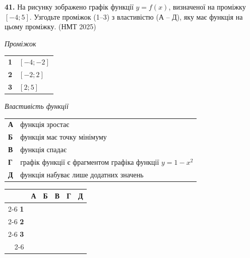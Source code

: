 \documentclass[14pt]{extarticle}
\newcommand{\nmtyear}[1]{\hfill{\small\color{yearcolor}(НМТ #1)}}
\begin{document}
\noindent\textbf{41.} На рисунку зображено графік функції $y=f(x)$, визначеної на проміжку $[-4; 5]$. Узгодьте проміжок (1–3) з властивістю (А – Д), яку має функція на цьому проміжку. \nmtyear{2025}

\vspace{0.2cm}

\noindent
\begin{minipage}[t]{0.55\textwidth}
    \vspace{0pt}
    \textit{Проміжок} \par \vspace{0.2cm}
    \begin{tabular}{@{}p{0.5cm} p{3cm}@{}}
    \textbf{1} & $[-4; -2]$ \\[0.3cm]
    \textbf{2} & $[-2; 2]$ \\[0.3cm]
    \textbf{3} & $[2; 5]$ \\
    \end{tabular}
    
    \vspace{0.3cm}
    \textit{Властивість функції} \par \vspace{0.2cm}
    \begin{tabular}{@{}p{0.5cm} p{7cm}@{}}
    \textbf{А} & функція зростає \\[0.2cm]
    \textbf{Б} & функція має точку мінімуму \\[0.2cm]
    \textbf{В} & функція спадає \\[0.2cm]
    \textbf{Г} & графік функції є фрагментом графіка функції $y=1-x^2$ \\[0.2cm]
    \textbf{Д} & функція набуває лише додатних значень \\
    \end{tabular}
    
    \vspace{0.3cm}
    
    \begingroup
    \setlength{\tabcolsep}{4pt}
    \renewcommand{\arraystretch}{1.2}
    \small
    \begin{tabular}{r|c|c|c|c|c|}
         \multicolumn{1}{c}{} & \multicolumn{1}{c}{\textbf{А}} & \multicolumn{1}{c}{\textbf{Б}} & \multicolumn{1}{c}{\textbf{В}} & \multicolumn{1}{c}{\textbf{Г}} & \multicolumn{1}{c}{\textbf{Д}} \\ \cline{2-6}
         \textbf{1} & & & & & \\ \cline{2-6}
         \textbf{2} & & & & & \\ \cline{2-6}
         \textbf{3} & & & & & \\ \cline{2-6}
    \end{tabular}
    \endgroup
\end{minipage}%
\end{document}
